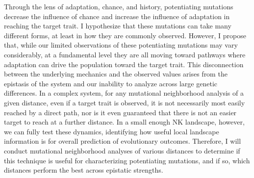 Through the lens of adaptation, chance, and history, potentiating mutations decrease the influence of chance and increase the influence of adaptation in reaching the target trait. 
I hypothesize that these mutations can take many different forms, at least in how they are commonly observed.
However, I propose that, while our limited observations of these potentiating mutations may vary considerably, at a fundamental level they are all moving toward pathways where adaptation can drive the population toward the target trait. 
This disconnection between the underlying mechanics and the observed values arises from the epistasis of the system and our inability to analyze across large genetic differences.
In a complex system, for any mutational neighborhood analysis of a given distance, even if a target trait is observed, it is not necessarily most easily reached by a direct path, nor is it even guaranteed that there is not an easier target to reach at a further distance.
In a small enough NK landscape, however, we can fully test these dynamics, identifying how useful local landscape information is for overall prediction of evolutionary outcomes.
Therefore, I will conduct mutational neighborhood analyses of various distances to determine if this technique is useful for characterizing potentiating mutations, and if so, which distances perform the best across epistatic strengths. 

